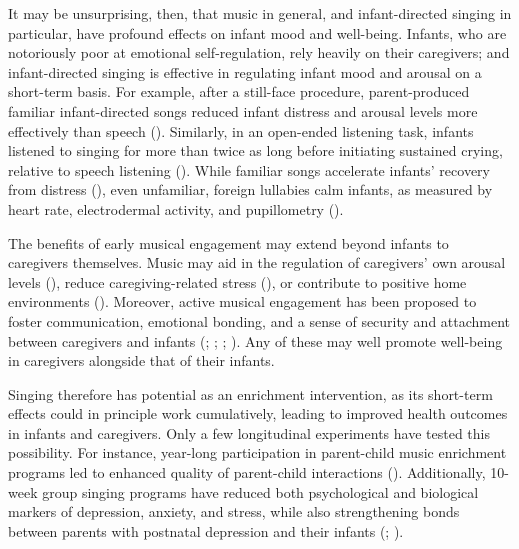\documentclass[
]{article}
\begin{document}
It may be unsurprising, then, that music in general, and infant-directed
singing in particular, have profound effects on infant mood and
well-being. Infants, who are notoriously poor at emotional
self-regulation, rely heavily on their caregivers; and infant-directed
singing is effective in regulating infant mood and arousal on a
short-term basis. For example, after a still-face procedure,
parent-produced familiar infant-directed songs reduced infant distress
and arousal levels more effectively than speech
(). Similarly, in an
open-ended listening task, infants listened to singing for more than
twice as long before initiating sustained crying, relative to speech
listening (). While
familiar songs accelerate infants' recovery from distress
(), even unfamiliar,
foreign lullabies calm infants, as measured by heart rate, electrodermal
activity, and pupillometry ().

The benefits of early musical engagement may extend beyond infants to
caregivers themselves. Music may aid in the regulation of caregivers'
own arousal levels (),
reduce caregiving-related stress (), or contribute to positive home environments
(). Moreover, active
musical engagement has been proposed to foster communication, emotional
bonding, and a sense of security and attachment between caregivers and
infants (;
;
;
). Any of these may
well promote well-being in caregivers alongside that of their infants.

Singing therefore has potential as an enrichment intervention, as its
short-term effects could in principle work cumulatively, leading to
improved health outcomes in infants and caregivers. Only a few
longitudinal experiments have tested this possibility. For instance,
year-long participation in parent-child music enrichment programs led to
enhanced quality of parent-child interactions
(). Additionally, 10-week
group singing programs have reduced both psychological and biological
markers of depression, anxiety, and stress, while also strengthening
bonds between parents with postnatal depression and their infants
(;
).
\end{document}

